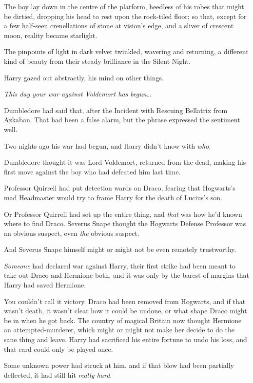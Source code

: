 The boy lay down in the centre of the platform, heedless of his robes that might be dirtied, dropping his head to rest upon the rock-tiled floor; so that, except for a few half-seen crenellations of stone at vision's edge, and a sliver of crescent moon, reality became starlight.

The pinpoints of light in dark velvet twinkled, wavering and returning, a different kind of beauty from their steady brilliance in the Silent Night.

Harry gazed out abstractly, his mind on other things.

\emph{This day your war against Voldemort has begun{\ldots}}

Dumbledore had said that, after the Incident with Rescuing Bellatrix from Azkaban. That had been a false alarm, but the phrase expressed the sentiment well.

Two nights ago his war had begun, and Harry didn't know with \emph{who}.

Dumbledore thought it was Lord Voldemort, returned from the dead, making his first move against the boy who had defeated him last time.

Professor Quirrell had put detection wards on Draco, fearing that Hogwarts's mad Headmaster would try to frame Harry for the death of Lucius's son.

Or Professor Quirrell had set up the entire thing, and \emph{that} was how he'd known where to find Draco. Severus Snape thought the Hogwarts Defense Professor was an obvious suspect, even \emph{the} obvious suspect.

And Severus Snape himself might or might not be even remotely trustworthy.

\emph{Someone} had declared war against Harry, their first strike had been meant to take out Draco and Hermione both, and it was only by the barest of margins that Harry had saved Hermione.

You couldn't call it victory. Draco had been removed from Hogwarts, and if that wasn't death, it wasn't clear how it could be undone, or what shape Draco might be in when he got back. The country of magical Britain now thought Hermione an attempted-murderer, which might or might not make her decide to do the sane thing and leave. Harry had sacrificed his entire fortune to undo his loss, and that card could only be played once.

Some unknown power had struck at him, and if that blow had been partially deflected, it had still hit \emph{really hard}.

